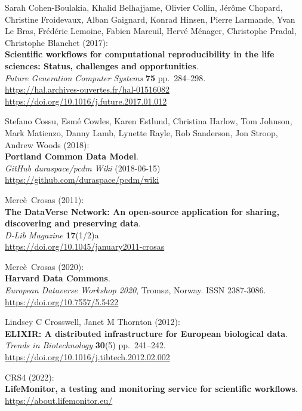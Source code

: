 \begin{thebibliography}{9}
Sarah Cohen-Boulakia, Khalid Belhajjame, Olivier Collin, Jérôme
Chopard, Christine Froidevaux, Alban Gaignard, Konrad Hinsen, Pierre
Larmande, Yvan Le Bras, Frédéric Lemoine, Fabien Mareuil, Hervé Ménager,
Christophe Pradal, Christophe Blanchet (2017):\\
\textbf{Scientific workflows for computational reproducibility in the
life sciences: Status, challenges and opportunities}.\\
\emph{Future Generation Computer Systems} \textbf{75} pp.~284--298.\\
\url{https://hal.archives-ouvertes.fr/hal-01516082}\\
\url{https://doi.org/10.1016/j.future.2017.01.012}

Stefano Cossu, Esmé Cowles, Karen Estlund, Christina Harlow,
Tom Johnson, Mark Matienzo, Danny Lamb, Lynette Rayle, Rob Sanderson,
Jon Stroop, Andrew Woods (2018):\\
\textbf{Portland Common Data Model}.\\
\emph{GitHub duraspace/pcdm Wiki} (2018-06-15)\\
\url{https://github.com/duraspace/pcdm/wiki}

Mercè~Crosas (2011):\\
\textbf{The DataVerse Network: An open-source application for sharing,
discovering and preserving data}.\\
\emph{D-Lib Magazine} \textbf{17}(1/2)a\\
\url{https://doi.org/10.1045/january2011-crosas}

Mercè~Crosas (2020):\\
\textbf{Harvard Data Commons}.\\
\emph{European Dataverse Workshop 2020}, Tromsø, Norway. ISSN
2387-3086.\\
\url{https://doi.org/10.7557/5.5422}

Lindsey C Crosswell, Janet M Thornton (2012):\\
\textbf{ELIXIR: A distributed infrastructure for European biological
data}.\\
\emph{Trends in Biotechnology} \textbf{30}(5) pp.~241--242.\\
\url{https://doi.org/10.1016/j.tibtech.2012.02.002}

CRS4 (2022):\\
\textbf{LifeMonitor, a testing and monitoring service for scientific
workflows}.\\
\url{https://about.lifemonitor.eu/}


\end{thebibliography}
